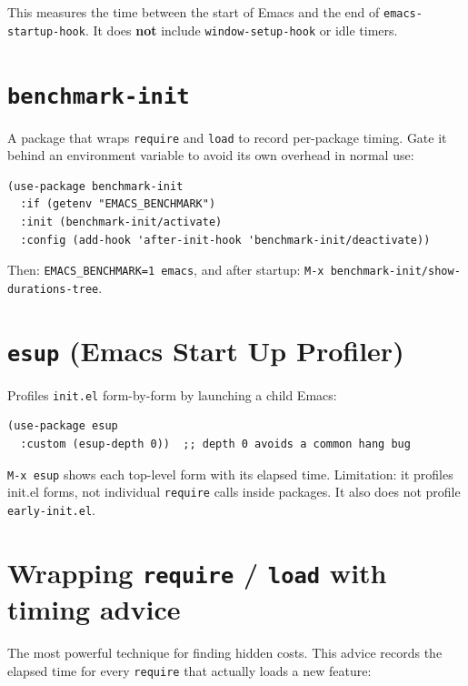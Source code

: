 This measures the time between the start of Emacs and the end of \texttt{emacs-startup-hook}. It does \textbf{not} include \texttt{window-setup-hook} or idle timers.

\section{\texttt{benchmark-init}}\label{benchmark-init}

A package that wraps \texttt{require} and \texttt{load} to record per-package timing. Gate it behind an environment variable to avoid its own overhead in normal use:

\begin{verbatim}
(use-package benchmark-init
  :if (getenv "EMACS_BENCHMARK")
  :init (benchmark-init/activate)
  :config (add-hook 'after-init-hook 'benchmark-init/deactivate))
\end{verbatim}

Then: \texttt{EMACS\_BENCHMARK=1 emacs}, and after startup: \texttt{M-x benchmark-init/show-durations-tree}.

\section{\texttt{esup} (Emacs Start Up Profiler)}\label{esup-emacs-start-up-profiler}

Profiles \texttt{init.el} form-by-form by launching a child Emacs:

\begin{verbatim}
(use-package esup
  :custom (esup-depth 0))  ;; depth 0 avoids a common hang bug
\end{verbatim}

\texttt{M-x esup} shows each top-level form with its elapsed time. Limitation: it profiles init.el forms, not individual \texttt{require} calls inside packages. It also does not profile \texttt{early-init.el}.

\section{Wrapping \texttt{require} / \texttt{load} with timing advice}\label{wrapping-require-load-with-timing-advice}

The most powerful technique for finding hidden costs. This advice records the elapsed time for every \texttt{require} that actually loads a new feature:

